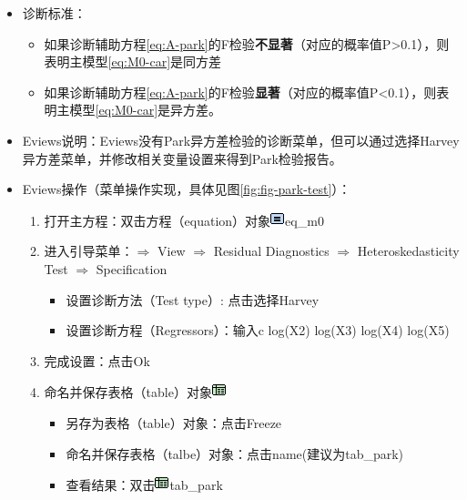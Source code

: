 \documentclass[12pt,(landscape,a4paper),(portrait,a4paper)]{article}
\providecommand{\tightlist}{%
  \setlength{\itemsep}{0pt}\setlength{\parskip}{0pt}}
\begin{document}
\begin{itemize}
\item
  诊断标准：

  \begin{itemize}
  \tightlist
  \item
    如果诊断辅助方程\eqref{eq:A-park}的F检验\textbf{不显著}（对应的概率值P\textgreater{}0.1），则表明主模型\eqref{eq:M0-car}是同方差
  \item
    如果诊断辅助方程\eqref{eq:A-park}的F检验\textbf{显著}（对应的概率值P\textless{}0.1），则表明主模型\eqref{eq:M0-car}是异方差。
  \end{itemize}
\item
  Eviews说明：Eviews没有Park异方差检验的诊断菜单，但可以通过选择Harvey异方差菜单，并修改相关变量设置来得到Park检验报告。
\item
  Eviews操作（菜单操作实现，具体见图\ref{fig:fig-park-test}）：

  \begin{enumerate}
  \def\labelenumi{\arabic{enumi})}
  \tightlist
  \item
    打开主方程：双击方程（equation）对象\includegraphics{picture/object/Equation.png}eq\_m0\\
  \item
    进入引导菜单：\(\Rightarrow\) View \(\Rightarrow\) Residual
    Diagnostics \(\Rightarrow\) Heteroskedasticity Test \(\Rightarrow\)
    Specification

    \begin{itemize}
    \tightlist
    \item
      设置诊断方法（Test type）: 点击选择Harvey
    \item
      设置诊断方程（Regressors）：输入c log(X2) log(X3) log(X4)
      log(X5)\\
    \end{itemize}
  \item
    完成设置：点击Ok\\
  \item
    命名并保存表格（table）对象\includegraphics{picture/object/Table.png}

    \begin{itemize}
    \tightlist
    \item
      另存为表格（table）对象：点击Freeze
    \item
      命名并保存表格（talbe）对象：点击name(建议为tab\_park)
    \item
      查看结果：双击\includegraphics{picture/object/Table.png}tab\_park
    \end{itemize}
  \end{enumerate}
\end{itemize}
\end{document}
